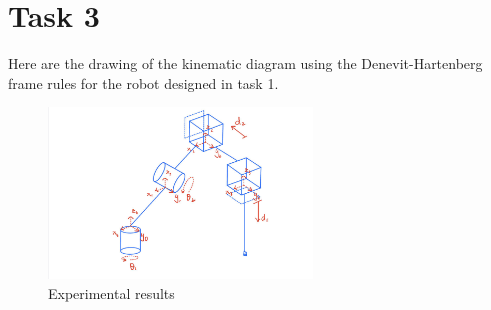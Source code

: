\section{Task 3}
\FloatBarrier %

Here are the drawing of the kinematic diagram using the Denevit-Hartenberg frame rules for the robot designed in task 1.

\begin{figure}[htbp]
    \centering
    \includegraphics[width=7cm]{./fig/D-H.jpg}
    \caption{Experimental results}
    \label{f5}
\end{figure}

